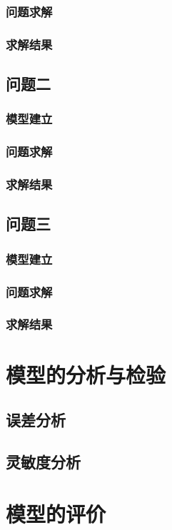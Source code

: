 \documentclass[withoutpreface,bwprint]{cumcmthesis} %
\begin{document}
\subsubsection{问题求解}
\subsubsection{求解结果}

\subsection{问题二}
\subsubsection{模型建立}
\subsubsection{问题求解}
\subsubsection{求解结果}

\subsection{问题三}
\subsubsection{模型建立}
\subsubsection{问题求解}
\subsubsection{求解结果}

\section{模型的分析与检验}
\subsection{误差分析}
\subsection{灵敏度分析}


\section{模型的评价}
\end{document}
